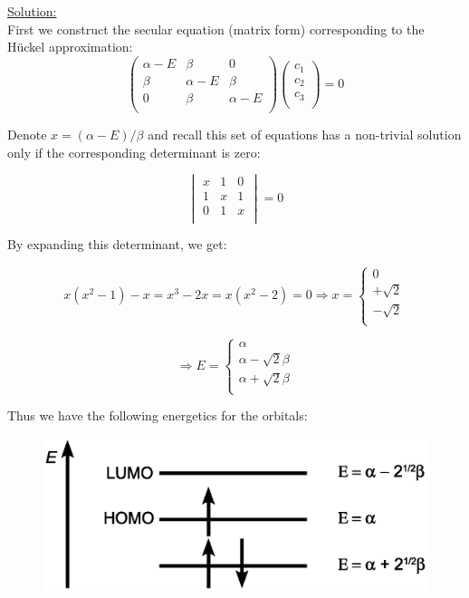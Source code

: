 \noindent
\underline{Solution:}\\

\noindent
First we construct the secular equation (matrix form) corresponding to the 
H\"uckel approximation:\\

$$\begin{pmatrix}
\alpha - E & \beta & 0\\
\beta & \alpha - E & \beta\\
0 & \beta & \alpha - E\\
\end{pmatrix}
\begin{pmatrix}
c_1\\
c_2\\
c_3\\
\end{pmatrix}
= 0$$

\noindent
Denote $x = (\alpha - E) / \beta$ and recall this set of equations
has a non-trivial solution only if the corresponding determinant is zero:

$$\begin{vmatrix}
x & 1 & 0\\
1 & x & 1\\
0 & 1 & x\\
\end{vmatrix}
= 0$$

\noindent
By expanding this determinant, we get:

$$x(x^2 - 1) - x = x^3 - 2x = x(x^2 - 2) = 0 \Rightarrow x =
\left\{
\begin{matrix}
0\\
+\sqrt{2}\\
-\sqrt{2}\\
\end{matrix}
\right.
$$

$$\Rightarrow E = \left\{\begin{matrix}
\alpha\\
\alpha - \sqrt{2}\beta\\
\alpha + \sqrt{2}\beta\\
\end{matrix}\right.
$$

\noindent
Thus we have the following energetics for the orbitals:

\begin{figure}[h]
\centering
\includegraphics[scale=0.4]{huckelmo}
\end{figure}

